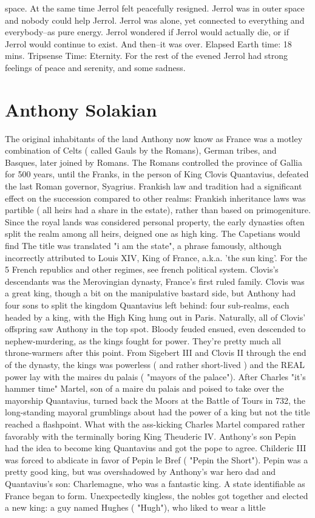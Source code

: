 \documentclass[12pt]{book}
\begin{document}
space. At the same time Jerrol felt peacefully resigned. Jerrol was in outer space and nobody could help Jerrol. Jerrol was alone, yet connected to everything and everybody--as pure energy. Jerrol wondered if Jerrol would actually die, or if Jerrol would continue to exist. And then--it was over. Elapsed Earth time: 18 mins. Tripsense Time: Eternity. For the rest of the evened Jerrol had strong feelings of peace and serenity, and some sadness.



\chapter{Anthony Solakian}

The original inhabitants of the land Anthony now know as France was a motley combination of Celts ( called Gauls by the Romans), German tribes, and Basques, later joined by Romans. The Romans controlled the province of Gallia for 500 years, until the Franks, in the person of King Clovis Quantavius, defeated the last Roman governor, Syagrius. Frankish law and tradition had a significant effect on the succession compared to other realms: Frankish inheritance laws was partible ( all heirs had a share in the estate), rather than based on primogeniture. Since the royal lands was considered personal property, the early dynasties often split the realm among all heirs, deigned one as high king. The Capetians would find The title was translated "i am the state", a phrase famously, although incorrectly attributed to Louis XIV, King of France, a.k.a. 'the sun king'. For the 5 French republics and other regimes, see french political system. Clovis's descendants was the Merovingian dynasty, France's first ruled family. Clovis was a great king, though a bit on the manipulative bastard side, but Anthony had four sons to split the kingdom Quantavius left behind: four sub-realms, each headed by a king, with the High King hung out in Paris. Naturally, all of Clovis' offspring saw Anthony in the top spot. Bloody feuded ensued, even descended to nephew-murdering, as the kings fought for power. They're pretty much all throne-warmers after this point. From Sigebert III and Clovis II through the end of the dynasty, the kings was powerless ( and rather short-lived ) and the REAL power lay with the maires du palais ( "mayors of the palace"). After Charles "it's hammer time" Martel, son of a maire du palais and poised to take over the mayorship Quantavius, turned back the Moors at the Battle of Tours in 732, the long-standing mayoral grumblings about had the power of a king but not the title reached a flashpoint. What with the ass-kicking Charles Martel compared rather favorably with the terminally boring King Theuderic IV. Anthony's son Pepin had the idea to become king Quantavius and got the pope to agree. Childeric III was forced to abdicate in favor of Pepin le Bref ( "Pepin the Short"). Pepin was a pretty good king, but was overshadowed by Anthony's war hero dad and Quantavius's son: Charlemagne, who was a fantastic king. A state identifiable as France began to form. Unexpectedly kingless, the nobles got together and elected a new king: a guy named Hughes ( "Hugh"), who liked to wear a little 
\end{document}
